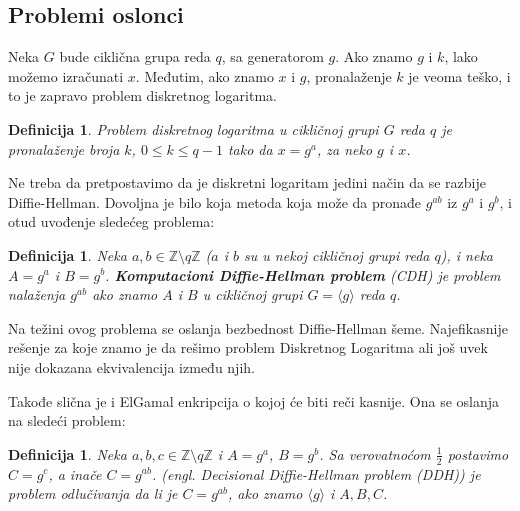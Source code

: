 \documentclass[a4paper]{article}
\newtheorem{defn}[primer]{Definicija}
\begin{document}
\subsection{Problemi oslonci}
\label{subsec:problemi_oslonci}

Neka $G$ bude ciklična grupa reda $q$, sa generatorom $g$. %
Ako znamo $g$ i $k$, lako možemo izračunati $x$. Međutim, ako znamo $x$ i $g$, pronalaženje $k$ je veoma teško, 
i to je zapravo problem diskretnog logaritma.

\begin{defn}
Problem diskretnog logaritma u cikličnoj grupi $G$ reda $q$ je pronalaženje broja $k$, $0 \leq k \leq q - 1$ 
tako da $x = g^a$, za neko $g$ i $x$.
\end{defn}


Ne treba da pretpostavimo da je diskretni logaritam jedini način da se razbije Diffie-Hellman. 
Dovoljna je bilo koja metoda koja može da pronađe $g^{ab}$ iz $g^a$ i $g^b$, i otud uvođenje sledećeg problema:

\begin{defn}
    Neka $a,b\in \mathbb{Z}\setminus q\mathbb{Z}$ ($a$ i $b$ su u nekoj cikličnoj grupi reda $q$),
    i neka $A = g^a$ i $B = g^b$.
    \textbf{Komputacioni Diffie-Hellman problem} (CDH) je problem nalaženja $g^{ab}$ ako znamo $A$ i $B$ u cikličnoj grupi
    $G = \langle g \rangle$ reda $q$.
\end{defn}

Na težini ovog problema se oslanja bezbednost Diffie-Hellman šeme.
Najefikasnije rešenje za koje znamo je da rešimo problem Diskretnog Logaritma 
ali još uvek nije dokazana ekvivalencija između njih. \cite{dlproblem}

Takođe slična je i ElGamal enkripcija o kojoj će biti reči kasnije. Ona se oslanja na sledeći problem:

\begin{defn}
    Neka $a,b,c\in \mathbb{Z}\setminus q\mathbb{Z}$ i $A = g^a$, $B = g^b$. Sa verovatnoćom $\frac{1}{2}$ postavimo $C = g^c$, 
    a inače $C = g^{ab}$.  (engl. \emph{Decisional Diffie-Hellman problem (DDH)}) je problem
    odlučivanja da li je $C = g^{ab}$, ako znamo $\langle g \rangle$ i $A, B, C$.
\end{defn}
\end{document}

